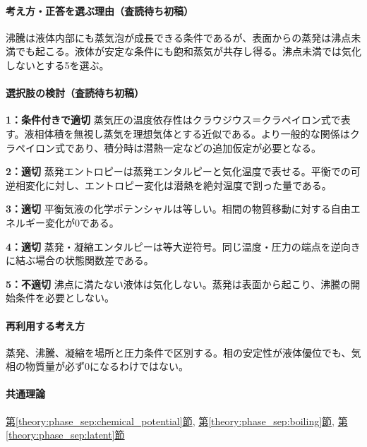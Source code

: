 \paragraph{考え方・正答を選ぶ理由（査読待ち初稿）} 沸騰は液体内部にも蒸気泡が成長できる条件であるが、表面からの蒸発は沸点未満でも起こる。液体が安定な条件にも飽和蒸気が共存し得る。沸点未満では気化しないとする5を選ぶ。

\paragraph{選択肢の検討（査読待ち初稿）}\mbox{}\par

\noindent\textbf{1：条件付きで適切} 蒸気圧の温度依存性はクラウジウス＝クラペイロン式で表す。液相体積を無視し蒸気を理想気体とする近似である。より一般的な関係はクラペイロン式であり、積分時は潜熱一定などの追加仮定が必要となる。\par

\noindent\textbf{2：適切} 蒸発エントロピーは蒸発エンタルピーと気化温度で表せる。平衡での可逆相変化に対し、エントロピー変化は潜熱を絶対温度で割った量である。\par

\noindent\textbf{3：適切} 平衡気液の化学ポテンシャルは等しい。相間の物質移動に対する自由エネルギー変化が0である。\par

\noindent\textbf{4：適切} 蒸発・凝縮エンタルピーは等大逆符号。同じ温度・圧力の端点を逆向きに結ぶ場合の状態関数差である。\par

\noindent\textbf{5：不適切} 沸点に満たない液体は気化しない。蒸発は表面から起こり、沸騰の開始条件を必要としない。\par

\paragraph{再利用する考え方} 蒸発、沸騰、凝縮を場所と圧力条件で区別する。相の安定性が液体優位でも、気相の物質量が必ず0になるわけではない。

\paragraph{共通理論} \hyperref[theory:phase_sep:chemical_potential]{第\ref*{theory:phase_sep:chemical_potential}節}, \hyperref[theory:phase_sep:boiling]{第\ref*{theory:phase_sep:boiling}節}, \hyperref[theory:phase_sep:latent]{第\ref*{theory:phase_sep:latent}節}

